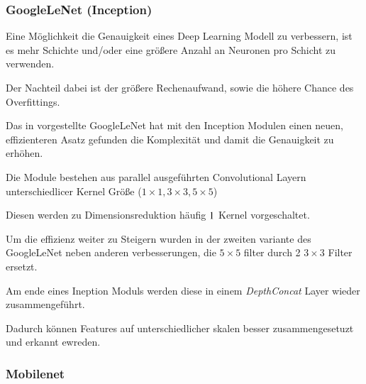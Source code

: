 \subsubsection{GoogleLeNet (Inception)}

Eine Möglichkeit die Genauigkeit eines Deep Learning Modell 
zu verbessern, ist es mehr Schichte und/oder eine 
größere Anzahl an Neuronen pro Schicht zu verwenden.

Der Nachteil dabei ist der größere Rechenaufwand, sowie 
die höhere Chance des Overfittings.

Das in \cite{szegedyGoingDeeperConvolutions2014} vorgestellte GoogleLeNet hat mit den Inception 
Modulen einen neuen, effizienteren Asatz gefunden die 
Komplexität und damit die Genauigkeit zu erhöhen.

Die Module bestehen aus parallel ausgeführten 
Convolutional Layern unterschiedlicer Kernel 
Größe ($1\times1, 3\times3, 5\times5$)

Diesen werden zu Dimensionsreduktion häufig 
$1\time1$ Kernel vorgeschaltet.

Um die effizienz weiter zu Steigern wurden in 
der zweiten variante des GoogleLeNet
\cite{szegedyRethinkingInceptionArchitecture2015}
 neben anderen verbesserungen, die 
$ 5\times5$ filter durch 2  $3\times3$ Filter 
ersetzt.

Am ende eines Ineption Moduls werden diese 
in einem \textit{DepthConcat} Layer wieder zusammengeführt.

Dadurch können Features auf unterschiedlicher skalen 
besser zusammengesetuzt und erkannt ewreden.



\begin{minipage}{0.5\textwidth}
    \centering
    
    \label{fig:incept_modul}
\end{minipage}
\begin{minipage}{0.5\textwidth}
    \centering
    
    \label{fig:incept_modul}
\end{minipage}




\subsubsection{Mobilenet}

\cite{howardMobileNetsEfficientConvolutional2017a}

